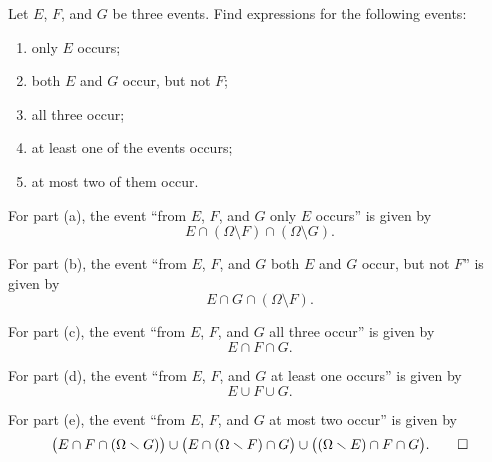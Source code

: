 \begin{problem}[Handout 1, \# 11]
  Let \(E\), \(F\), and \(G\) be three events. Find expressions for the
  following events:
  \begin{enumerate}[label=(\alph*),noitemsep]
  \item only \(E\) occurs;
  \item both \(E\) and \(G\) occur, but not \(F\);
  \item all three occur;
  \item at least one of the events occurs;
  \item at most two of them occur.
  \end{enumerate}
\end{problem}
\begin{solution*}
  For part (a), the event ``from \(E\), \(F\), and \(G\) only \(E\)
  occurs'' is given by
  \[
    E\cap(\Omega\setminus F)\cap(\Omega\setminus G).
  \]

  For part (b), the event ``from \(E\), \(F\), and \(G\) both \(E\) and
  \(G\) occur, but not \(F\)'' is given by
  \[
    E\cap G\cap(\Omega\setminus F).
  \]

  For part (c), the event ``from \(E\), \(F\), and \(G\) all three occur''
  is given by
  \[
    E\cap F\cap G.
  \]

  For part (d), the event ``from \(E\), \(F\), and \(G\) at least one
  occurs'' is given by
  \[
    E\cup F\cup G.
  \]

  For part (e), the event ``from \(E\), \(F\), and \(G\) at most two
  occur'' is given by
  \[
    \bigl(E\cap F\cap(\Omega\setminus G)\bigr)\cup%
    \bigl(E\cap (\Omega\setminus F)\cap G\bigr)\cup%
    \bigl((\Omega\setminus E)\cap F\cap G\bigr).\qedhere
  \]
\end{solution*}

